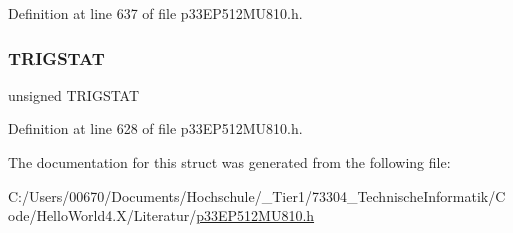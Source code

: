 Definition at line 637 of file p33\+E\+P512\+M\+U810.\+h.

\mbox{\label{structtag_i_c2_c_o_n2_b_i_t_s_ab379549de54ac93ad4aa73686c34cb7c}} 
\subsubsection{\texorpdfstring{T\+R\+I\+G\+S\+T\+AT}{TRIGSTAT}}
{\footnotesize\ttfamily unsigned T\+R\+I\+G\+S\+T\+AT}



Definition at line 628 of file p33\+E\+P512\+M\+U810.\+h.



The documentation for this struct was generated from the following file\+:\begin{DoxyCompactItemize}
\item 
C\+:/\+Users/00670/\+Documents/\+Hochschule/\+\_\+\+Tier1/73304\+\_\+\+Technische\+Informatik/\+Code/\+Hello\+World4.\+X/\+Literatur/\hyperlink{p33_e_p512_m_u810_8h}{p33\+E\+P512\+M\+U810.\+h}\end{DoxyCompactItemize}
